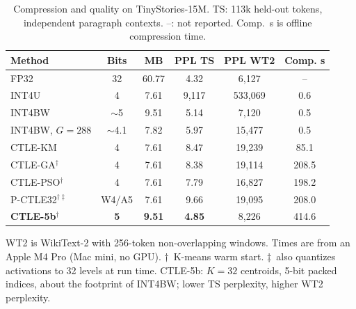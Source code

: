 %

\begin{table}[t]
\centering
\footnotesize
\caption{Compression and quality on TinyStories-15M. TS: 113k held-out
tokens, independent paragraph contexts. --: not reported. Comp.\ s is offline compression time.}
\label{tab:ablation}
\setlength{\tabcolsep}{3pt}
\renewcommand{\arraystretch}{1.15}
\begin{tabular}{lccccc}
\toprule
\textbf{Method} & \textbf{Bits} & \textbf{MB} &
\textbf{PPL TS} & \textbf{PPL WT2} & \textbf{Comp. s} \\
\midrule
FP32                & 32   & 60.77 & 4.32 & 6{,}127 & -- \\
\midrule
INT4U               & 4    &  7.61 & 9{,}117 & 533{,}069 & 0.6 \\
INT4BW              & $\sim$5 & 9.51 & 5.14 & 7{,}120 & 0.5 \\
INT4BW, $G{=}288$   & $\sim$4.1 & 7.82 & 5.97 & 15{,}477 & 0.5 \\
\midrule
CTLE-KM             & 4    &  7.61 & 8.47 & 19{,}239 & 85.1 \\
CTLE-GA$^\dagger$   & 4    &  7.61 & 8.38 & 19{,}114 & 208.5 \\
CTLE-PSO$^\dagger$  & 4    &  7.61 & 7.79 & 16{,}827 & 198.2 \\
P-CTLE32$^{\dagger\ddagger}$ & W4/A5 & 7.61 & 9.66 & 19{,}095 & 208.0 \\
\textbf{CTLE-5b}$^\dagger$ & \textbf{5} & \textbf{9.51} & \textbf{4.85} & 8{,}226 & 414.6 \\
\bottomrule
\end{tabular}
%
\smallskip
\begin{minipage}{0.98\columnwidth}
  \footnotesize
  WT2 is WikiText-2 with 256-token non-overlapping windows. Times are from an
  Apple M4 Pro (Mac mini, no GPU).
  $\dagger$~K-means warm start.
  $\ddagger$~also quantizes activations to 32 levels at run time.
  CTLE-5b: $K\!=\!32$ centroids, 5-bit packed indices, about the footprint of
  INT4BW; lower TS perplexity, higher WT2 perplexity.
\end{minipage}
\end{table}
